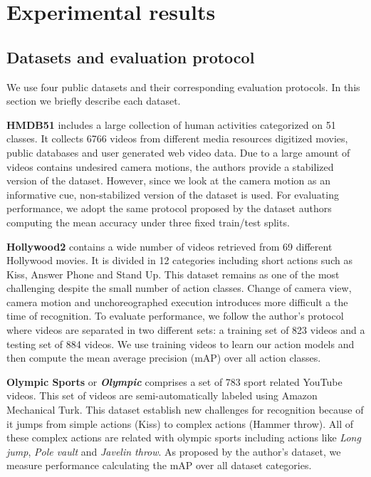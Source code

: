 \section{Experimental results}
\label{results}
\subsection{Datasets and evaluation protocol}
\label{subsec:datasets}
We use four public datasets \cite{kuehne2011, marszalek2009, niebles2010, reddy2013} and their corresponding evaluation protocols. In this section we briefly describe each dataset.

\textbf{HMDB51} \cite{kuehne2011} includes a large collection of human activities categorized on 51 classes. It collects 6766 videos from different media resources \ie digitized movies, public databases and user generated web video data. Due to a large amount of videos contains undesired camera motions, the authors provide a stabilized version of the dataset. However, since we look at the camera motion as an informative cue, non-stabilized version of the dataset is used. For evaluating performance, we adopt the same protocol proposed by the dataset authors \ie computing the mean accuracy under three fixed train/test splits.

\textbf{Hollywood2} \cite{marszalek2009} contains a wide number of videos retrieved from 69 different Hollywood movies. It is divided in 12 categories including short actions such as Kiss, Answer Phone and Stand Up. This dataset remains as one of the most challenging despite the small number of action classes. Change of camera view,  camera motion and unchoreographed execution introduces more difficult a the time of recognition. To evaluate performance, we follow the author's protocol where videos are separated in two different sets: a training set of 823 videos and a testing set of 884 videos. We use training videos to learn our action models and then compute the mean average precision (mAP) over all action classes.

\textbf{Olympic Sports} \cite{niebles2010} or \textbf\textit{{Olympic}} comprises a set of 783 sport related YouTube videos. This set of videos are semi-automatically labeled using Amazon Mechanical Turk. This dataset establish new challenges for recognition because of it jumps from simple actions (\eg Kiss) to complex actions (\eg Hammer throw). All of these complex actions are related with olympic sports including actions like \textit{Long jump}, \textit{Pole vault} and \textit{Javelin throw}. As proposed by the author's dataset, we measure performance calculating the mAP over all dataset categories.

